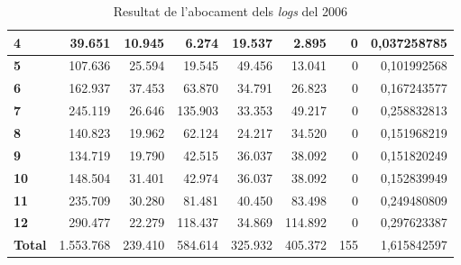\begin{table}[h!]
\begin{adjustbox}{width=1.5\textwidth, center}
\begin{tabular}{|l|r|r|r|r|r|r|r|}
            \textbf{4}     & 39.651       & 10.945     & 6.274      & 19.537     & 2.895      & 0            & 0,037258785          \\
            \midrule
            \textbf{5}     & 107.636      & 25.594     & 19.545     & 49.456     & 13.041     & 0            & 0,101992568          \\
            \textbf{6}     & 162.937      & 37.453     & 63.870     & 34.791     & 26.823     & 0            & 0,167243577          \\
            \textbf{7}     & 245.119      & 26.646     & 135.903    & 33.353     & 49.217     & 0            & 0,258832813          \\
            \textbf{8}     & 140.823      & 19.962     & 62.124     & 24.217     & 34.520     & 0            & 0,151968219          \\
            \midrule
            \textbf{9}     & 134.719      & 19.790     & 42.515     & 36.037     & 38.092     & 0            & 0,151820249          \\
            \textbf{10}    & 148.504      & 31.401     & 42.974     & 36.037     & 38.092     & 0            & 0,152839949          \\
            \textbf{11}    & 235.709      & 30.280     & 81.481     & 40.450     & 83.498     & 0            & 0,249480809          \\
            \textbf{12}    & 290.477      & 22.279     & 118.437    & 34.869     & 114.892    & 0            & 0,297623387          \\
            \midrule
            \textbf{Total} & 1.553.768    & 239.410    & 584.614    & 325.932    & 405.372    & 155          & 1,615842597          \\
            \bottomrule
        \end{tabular}
    \end{adjustbox}
    \caption{Resultat de l'abocament dels \textit{logs} del 2006}
    \label{tab:logs-table-2006}
\end{table}
